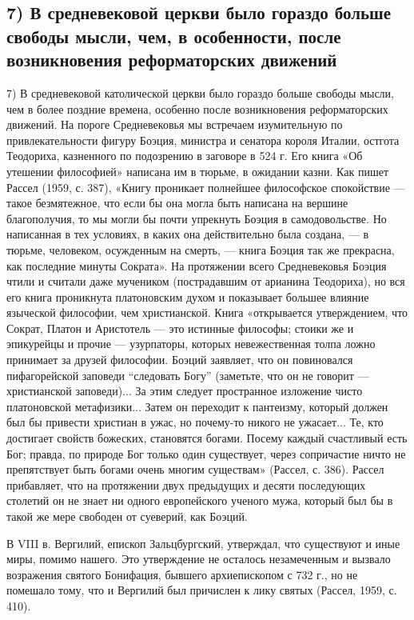 \subsection{7)  В средневековой  церкви  было  гораздо больше  свободы
мысли,   чем,  в   особенности,  после   возникновения  реформаторских
движений}

7)  В средневековой  католической церкви  было гораздо  больше свободы
мысли,  чем  в более  поздние  времена,  особенно после  возникновения
реформаторских   движений.  На   пороге  Средневековья   мы  встречаем
изумительную по  привлекательности фигуру Боэция, министра  и сенатора
короля Италии, остгота Теодориха,  казненного по подозрению в заговоре
в 524  г. Его книга «Об  утешении философией» написана им  в тюрьме, в
ожидании  казни. Как  пишет Рассел  (1959, с.  387), «Книгу  проникает
полнейшее философское  спокойствие --- такое безмятежное,  что если бы
она могла быть написана на вершине  благополучия, то мы могли бы почти
упрекнуть Боэция  в самодовольстве.  Но написанная  в тех  условиях, в
каких  она  действительно  была  создана,  ---  в  тюрьме,  человеком,
осужденным на смерть, --- книга Боэция так же прекрасна, как последние
минуты  Сократа». На  протяжении  всего Средневековья  Боэция чтили  и
считали  даже  мучеником  (пострадавшим  от  арианина  Теодориха),  но
вся  его  книга проникнута  платоновским  духом  и показывает  большее
влияние  языческой  философии,  чем христианской.  Книга  «открывается
утверждением,  что  Сократ,  Платон  и  Аристотель  ---  это  истинные
философы;  стоики же  и эпикурейцы  и прочие  --- узурпаторы,  которых
невежественная  толпа  ложно  принимает за  друзей  философии.  Боэций
заявляет, что он повиновался пифагорейской заповеди ``следовать Богу''
(заметьте, что  он не  говорит ---  христианской заповеди)...  За этим
следует пространное  изложение чисто платоновской  метафизики... Затем
он переходит  к пантеизму, который  должен был бы привести  христиан в
ужас,  но почему-то  никого не  ужасает... Те,  кто достигает  свойств
божеских,  становятся  богами.  Посему  каждый  счастливый  есть  Бог;
правда, по природе Бог только один существует, через сопричастие ничто
не  препятствует  быть  богами  очень многим  существам»  (Рассел,  с.
386). Рассел  прибавляет, что на  протяжении двух предыдущих  и десяти
последующих столетий он не знает  ни одного европейского ученого мужа,
который был бы в такой же мере свободен от суеверий, как Боэций.

В VIII в. Вергилий, епископ Зальцбургский, утверждал, что существуют и
иные миры, помимо  нашего. Это утверждение не  осталось незамеченным и
вызвало возражения святого Бонифация,  бывшего архиепископом с 732 г.,
но  не помешало  тому,  что и  Вергилий был  причислен  к лику  святых
(Рассел, 1959, с. 410).

